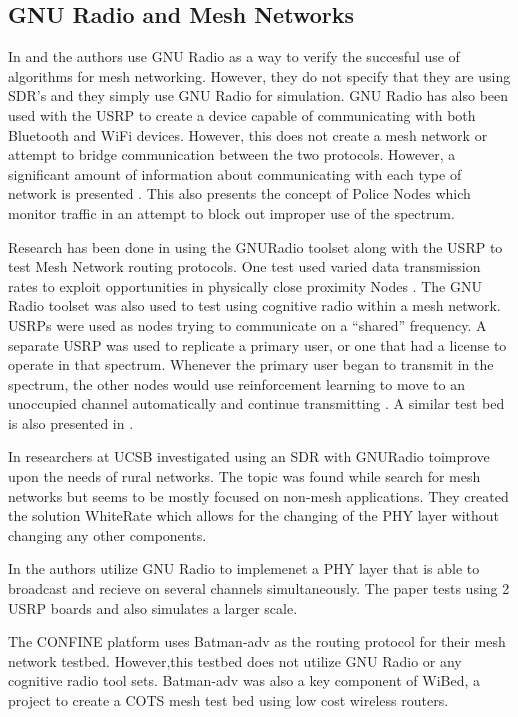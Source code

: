 \subsection{GNU Radio and Mesh Networks}

In \cite{4509617} and \cite{5062250} the authors use GNU Radio as a way to verify the succesful use of algorithms for mesh networking. However, they do not specify that they are using SDR's and they simply use GNU Radio for simulation. GNU Radio has also been used with the USRP to create a device capable of communicating with both Bluetooth and WiFi devices. However, this does not create a mesh network or attempt to bridge communication between the two protocols. However, a significant amount of information about communicating with each type of network is presented \cite{4292880}. This also presents the concept of Police Nodes which monitor traffic in an attempt to block out improper use of the spectrum. 

Research has been done in using the GNURadio toolset along with the USRP to test Mesh Network routing protocols. One test used varied data transmission rates to exploit opportunities in physically close proximity Nodes \cite{5462112}. The GNU Radio toolset was also used to test using cognitive radio within a mesh network. USRPs were used as nodes trying to communicate on a
``shared'' frequency. A separate USRP was used to replicate a primary user, or one that had a license to operate in that spectrum. Whenever the primary user began to transmit in the spectrum, the other nodes would use reinforcement learning to move to an unoccupied channel automatically and continue transmitting \cite{7141228}. A similar test bed is also presented in \cite{5508221}.

In \cite{5984947} researchers at UCSB investigated using an SDR with GNURadio toimprove upon the needs of rural networks. The topic was found while search for mesh networks but seems to be mostly focused on non-mesh applications. They created the solution WhiteRate which allows for the changing of the PHY layer without changing any other components. 

In \cite{5462039} the authors utilize GNU Radio to implemenet a PHY layer that is able to broadcast and recieve on several channels simultaneously. The paper
tests using 2 USRP boards and also simulates a larger scale.  

The CONFINE platform uses Batman-adv as the routing protocol for their mesh network testbed. However,this testbed does not utilize GNU Radio or any cognitive radio tool sets. \cite{0001} Batman-adv was also a key component of WiBed, a project to create a COTS mesh test bed using low cost wireless
routers. \cite{6686492} \cite{6962154}
